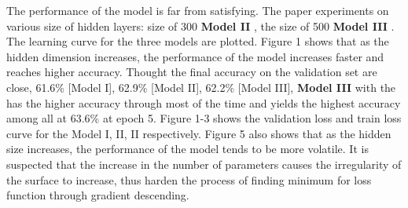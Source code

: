 \documentclass[10pt]{article}
\begin{document}
The performance of the model is far from satisfying. The paper experiments on various size of hidden layers: size of 300 \textbf{Model II} , the size of 500 \textbf{Model III} . The learning curve for the three models are plotted. Figure 1 shows that as the hidden dimension increases, the performance of the model increases faster and reaches higher accuracy. Thought the final accuracy on the validation set are close, 61.6\%  [Model I], 62.9\%  [Model II], 62.2\%  [Model III], \textbf{Model III}  with the has the higher accuracy through most of the time and yields the highest accuracy among all at 63.6\% at epoch 5. Figure 1-3 shows the validation loss and train loss curve for the Model I, II, II respectively.
 Figure 5 also shows that as the hidden size increases, the performance of the model tends to be more volatile. It is suspected that the increase in the number of parameters causes the irregularity of the surface to increase, thus harden the process of finding minimum for loss function through gradient descending.
\end{document}
